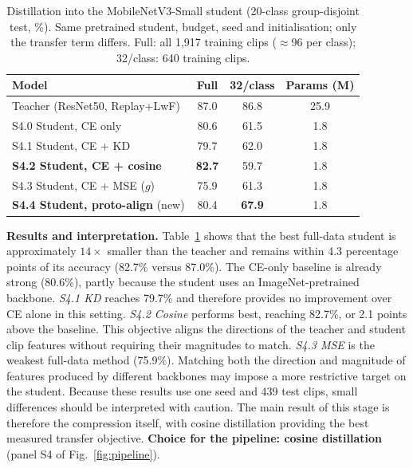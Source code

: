 \documentclass[conference]{IEEEtran}
\begin{document}
\begin{table}[t]
\centering
\caption{Distillation into the MobileNetV3-Small student (20-class group-disjoint test, \%).
Same pretrained student, budget, seed and initialisation; only the transfer term differs.
Full: all 1{,}917 training clips ($\approx$96 per class); 32/class: 640 training clips.}
\label{tab:kd}
\renewcommand{\arraystretch}{1.1}
\setlength{\tabcolsep}{4pt}
\begin{tabular}{lccc}
\toprule
Model & Full & 32/class & Params (M) \\
\midrule
Teacher (ResNet50, Replay+LwF)   & 87.0 & 86.8 & 25.9 \\
S4.0 Student, CE only            & 80.6 & 61.5 & 1.8 \\
S4.1 Student, CE + KD            & 79.7 & 62.0 & 1.8 \\
\textbf{S4.2 Student, CE + cosine} & \textbf{82.7} & 59.7 & 1.8 \\
S4.3 Student, CE + MSE ($g$)     & 75.9 & 61.3 & 1.8 \\
\textbf{S4.4 Student, proto-align} (new) & 80.4 & \textbf{67.9} & 1.8 \\
\bottomrule
\end{tabular}
\end{table}

\textbf{Results and interpretation.} Table~\ref{tab:kd} shows that the best full-data
student is approximately $14\times$ smaller than the teacher and remains within 4.3
percentage points of its accuracy (82.7\% versus 87.0\%). The CE-only baseline is already
strong (80.6\%), partly because the student uses an ImageNet-pretrained backbone.
\emph{S4.1 KD} reaches 79.7\% and therefore provides no improvement over CE alone in this
setting. \emph{S4.2 Cosine} performs best, reaching 82.7\%, or 2.1 points above the
baseline. This objective aligns the directions of the teacher and student clip features
without requiring their magnitudes to match. \emph{S4.3 MSE} is the weakest full-data
method (75.9\%). Matching both the direction and magnitude of features produced by
different backbones may impose a more restrictive target on the student. Because these
results use one seed and 439 test clips, small differences should be interpreted with
caution. The main result of this stage is therefore the compression itself, with cosine
distillation providing the best measured transfer objective. \textbf{Choice for the
pipeline: cosine distillation} (panel S4 of Fig.~\ref{fig:pipeline}).
\end{document}
